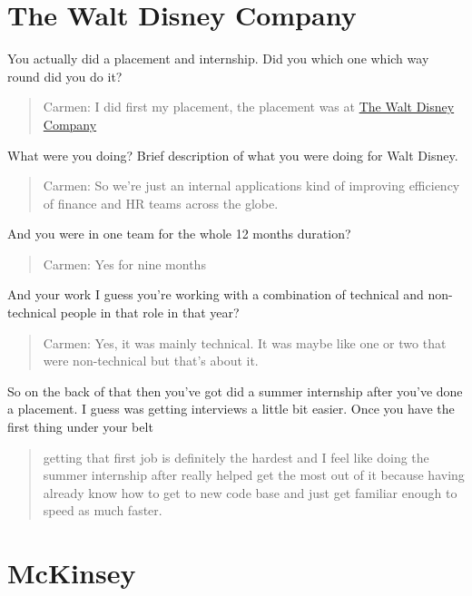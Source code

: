\documentclass[
]{book}
\begin{document}
\hypertarget{the-walt-disney-company}{%
\section{The Walt Disney Company}\label{the-walt-disney-company}}

You actually did a placement and internship. Did you which one which way round did you do it?

\begin{quote}
Carmen: I did first my placement, the placement was at \href{https://en.wikipedia.org/wiki/The_Walt_Disney_Company}{The Walt Disney Company} \citep{carmen2}
\end{quote}

What were you doing? Brief description of what you were doing for Walt Disney.

\begin{quote}
Carmen: So we're just an internal applications kind of improving efficiency of finance and HR teams across the globe.
\end{quote}

And you were in one team for the whole 12 months duration?

\begin{quote}
Carmen: Yes for nine months
\end{quote}

And your work I guess you're working with a combination of technical and non-technical people in that role in that year?

\begin{quote}
Carmen: Yes, it was mainly technical. It was maybe like one or two that were non-technical but that's about it.
\end{quote}

So on the back of that then you've got did a summer internship after you've done a placement. I guess was getting interviews a little bit easier. Once you have the first thing under your belt

\begin{quote}
getting that first job is definitely the hardest and I feel like doing the summer internship after really helped get the most out of it because having already know how to get to new code base and just get familiar enough to speed as much faster.
\end{quote}

\hypertarget{mckinsey}{%
\section{McKinsey}\label{mckinsey}}
\end{document}
